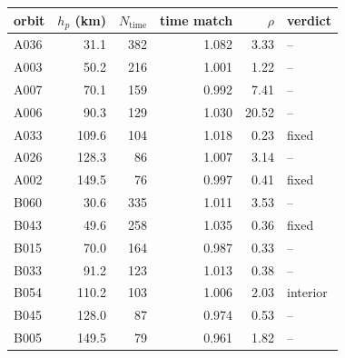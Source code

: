 \begin{tabular}{@{}l r r r r l@{}}
\toprule
orbit & $h_p$ (km) & $N_{\mathrm{time}}$ & time match & $\rho$ & verdict \\
\midrule
A036 & 31.1 & 382 & 1.082 & 3.33 & -- \\
A003 & 50.2 & 216 & 1.001 & 1.22 & -- \\
A007 & 70.1 & 159 & 0.992 & 7.41 & -- \\
A006 & 90.3 & 129 & 1.030 & 20.52 & -- \\
A033 & 109.6 & 104 & 1.018 & 0.23 & fixed \\
A026 & 128.3 & 86 & 1.007 & 3.14 & -- \\
A002 & 149.5 & 76 & 0.997 & 0.41 & fixed \\
B060 & 30.6 & 335 & 1.011 & 3.53 & -- \\
B043 & 49.6 & 258 & 1.035 & 0.36 & fixed \\
B015 & 70.0 & 164 & 0.987 & 0.33 & -- \\
B033 & 91.2 & 123 & 1.013 & 0.38 & -- \\
B054 & 110.2 & 103 & 1.006 & 2.03 & interior \\
B045 & 128.0 & 87 & 0.974 & 0.53 & -- \\
B005 & 149.5 & 79 & 0.961 & 1.82 & -- \\
\bottomrule
\end{tabular}
